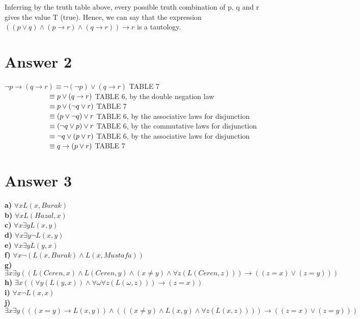 \documentclass[11pt]{article}
\begin{document}
Inferring by the truth table above, every possible truth combination of p, q and r gives the value T (true).
Hence, we can say that the expression $((p \lor q) \land (p \rightarrow r) \land (q \rightarrow r) ) \rightarrow r$
is a tautology.
\section*{Answer 2}

$\neg p \rightarrow (q \rightarrow r) \equiv \neg(\neg p) \lor (q \rightarrow r)$ TABLE 7 \\ 
$\null\>\>\>\>\>\>\>\>\>\>\>\>\>\>\>\>\>\>\>\>\>\>\>\>\>\>\>\equiv p \lor (q \rightarrow r)$ TABLE 6, by the double negation law \\
$\null\>\>\>\>\>\>\>\>\>\>\>\>\>\>\>\>\>\>\>\>\>\>\>\>\>\>\>\equiv p \lor (\neg q \lor r)$ TABLE 7 \\
$\null\>\>\>\>\>\>\>\>\>\>\>\>\>\>\>\>\>\>\>\>\>\>\>\>\>\>\>\equiv (p \lor \neg q) \lor r$ TABLE 6, by the associative laws for disjunction \\ 
$\null\>\>\>\>\>\>\>\>\>\>\>\>\>\>\>\>\>\>\>\>\>\>\>\>\>\>\>\equiv (\neg q \lor p) \lor r$ TABLE 6, by the commutative laws for disjunction \\
$\null\>\>\>\>\>\>\>\>\>\>\>\>\>\>\>\>\>\>\>\>\>\>\>\>\>\>\>\equiv \neg q \lor (p \lor r)$ TABLE 6, by the associative laws for disjunction \\
$\null\>\>\>\>\>\>\>\>\>\>\>\>\>\>\>\>\>\>\>\>\>\>\>\>\>\>\>\equiv  q \rightarrow (p \lor r)$ TABLE 7 \\

\section*{Answer 3}

\textbf{a)} $\forall x L(x,Burak)$ \\
\textbf{b)} $\forall x L(Hazal,x)$ \\
\textbf{c)} $\forall x \exists y L(x,y)$ \\
\textbf{d)} $\forall x \exists y \neg L(x,y)$ \\
\textbf{e)} $\forall x \exists y L(y,x)$ \\
\textbf{f)} $\forall x \neg (L(x,Burak) \land L(x,Mustafa))$ \\
\textbf{g)} $\exists x \exists y ((L(Ceren,x) \land L(Ceren,y) \land (x \neq y) \land \forall z(L(Ceren,z))) \rightarrow ((z=x) \lor (z=y)))$ \\
\textbf{h)} $\exists x((\forall y(L(y,x)) \land \forall \omega \forall z(L(\omega,z))) \rightarrow (z=x))$ \\
\textbf{i)} $\forall x \neg L(x,x)$ \\
\textbf{j)} $\exists x \exists y (((x=y) \rightarrow L(x,y)) \land (((x \neq y) \land L(x,y) \land \forall z(L(x,z)))) \rightarrow ((z=x) \lor (z=y)))$
\end{document}
